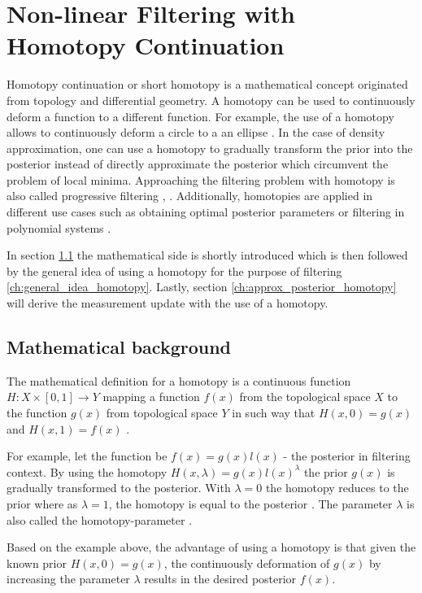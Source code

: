 \documentclass[a4paper]{IEEEtran}
\begin{document}
\section{Non-linear Filtering with Homotopy Continuation}
\label{ch:homotopy_continuation}

Homotopy continuation or short homotopy is a mathematical concept originated from topology and differential geometry. A homotopy can be used to continuously deform a function to a different function. For example, the use of a homotopy allows to continuously deform a
circle to a an ellipse \cite{liao2012}. In the case of density approximation, one can use a homotopy to gradually transform the prior into the posterior instead of directly approximate the posterior which circumvent the problem of local minima. Approaching the filtering problem 
with homotopy is also called progressive filtering \cite{hanebeck2003}, \cite{hanebeck2012a}. Additionally, homotopies are applied in different use cases such as obtaining optimal posterior parameters \cite{hagmar2011} or filtering in polynomial systems \cite{huber}.

In section \ref{ch:math_background_homotopy} the mathematical side is shortly introduced which is then followed by the general idea of using a homotopy for the purpose of filtering \ref{ch:general_idea_homotopy}. 
Lastly, section \ref{ch:approx_posterior_homotopy} will derive the measurement update with the use of a homotopy.

\subsection{Mathematical background}
\label{ch:math_background_homotopy}
The mathematical definition for a homotopy is a continuous function $H:X \times [0,1] \rightarrow Y$ mapping a function $f(x)$ from the topological space $X$ to the function $g(x)$ from topological space $Y$ in such way 
that $H(x,0)=g(x)$ and $H(x,1)=f(x)$ \cite{liao2012}. 

For example, let the function be $f(x)=g(x)l(x)$ - the posterior in filtering context. By using the homotopy $H(x, \lambda) = g(x)l(x)^{\lambda}$ the prior
$g(x)$ is gradually transformed to the posterior. With $\lambda = 0$ the homotopy reduces to the prior where as $\lambda = 1$, the homotopy is equal to the posterior \cite{daum2007}. The parameter $\lambda$ is also called the homotopy-parameter \cite{liao2012}.

Based on the example above, the advantage of using a homotopy is that given the known prior $H(x,0)=g(x)$, the continuously deformation of $g(x)$ by increasing the parameter $\lambda$ 
results in the desired posterior $f(x)$. 
\end{document}

